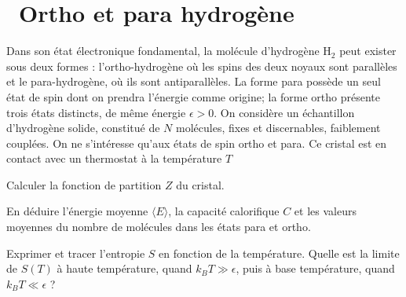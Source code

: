 \documentclass[utf8, 11pt]{feuille}
\begin{document}




\section{\medium~Ortho et para hydrogène}

Dans son état électronique fondamental, la molécule d'hydrogène H$_2$ peut exister sous deux formes : l'ortho-hydrogène où les spins des deux noyaux sont parallèles et le para-hydrogène, où ils sont antiparallèles. La forme para possède un seul état de spin dont on prendra l'énergie comme origine; la forme ortho présente trois états distincts, de même énergie $\epsilon >0$. On considère un échantillon d'hydrogène solide, constitué de $N$ molécules, fixes et discernables, faiblement couplées. On ne s'intéresse qu'aux états de spin ortho et para. Ce cristal est en contact avec un thermostat à la
température $T$


\question
Calculer la fonction de partition $Z$ du cristal.

\question
En déduire l'énergie moyenne $\langle E \rangle$, la capacité calorifique $C$ et les valeurs moyennes du nombre de molécules dans les états para et ortho.

\question
Exprimer et tracer l'entropie $S$ en fonction de la température.  Quelle est la limite de $S(T)$ à haute température, quand $k_BT \gg \epsilon $, puis à base température, quand $k_B T \ll \epsilon$ ?
  
\end{document}
